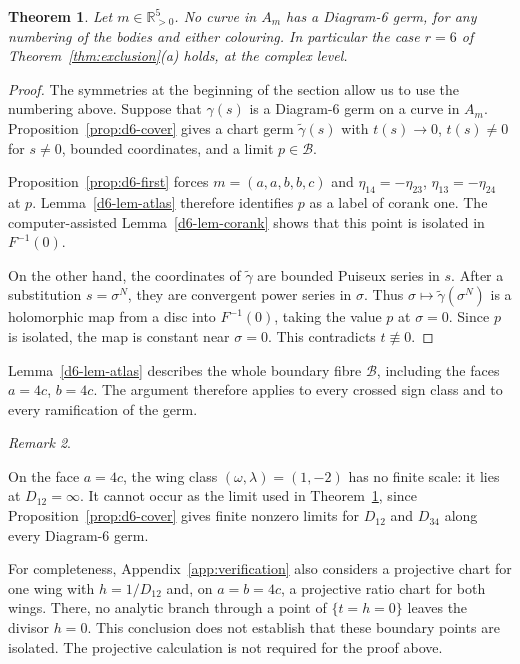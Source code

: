 \documentclass[11pt]{amsart}
\newtheorem{theorem}{Theorem}[section]
\theoremstyle{definition}
\theoremstyle{remark}
\newtheorem{remark}[theorem]{Remark}
\newcommand{\Rp}{\mathbb{R}_{>0}}
\begin{document}
\begin{theorem}\label{thm:d6}
Let $m\in\Rp^5$.  No curve in $A_m$ has a Diagram-6 germ, for any numbering of the bodies and
either colouring.  In particular the case $r=6$ of Theorem~\ref{thm:exclusion}(a) holds, at the
complex level.
\end{theorem}

\begin{proof}
{
The symmetries at the beginning of the section allow us to use the
numbering above.  Suppose that $\gamma(s)$ is a Diagram-6 germ on a curve
in $A_m$.  Proposition~\ref{prop:d6-cover} gives a chart germ
$\tilde\gamma(s)$ with $t(s)\to0$, $t(s)\ne0$ for $s\ne0$, bounded
coordinates, and a limit $p\in\mathcal B$.

Proposition~\ref{prop:d6-first} forces $m=(a,a,b,b,c)$ and
$\eta_{14}=-\eta_{23}$, $\eta_{13}=-\eta_{24}$ at $p$.
Lemma~\ref{d6-lem-atlas} therefore identifies $p$ as a label of corank one.
The computer-assisted Lemma~\ref{d6-lem-corank} shows that this point is
isolated in $F^{-1}(0)$.

On the other hand, the coordinates of $\tilde\gamma$ are bounded Puiseux
series in $s$.  After a substitution $s=\sigma^N$, they are convergent
power series in $\sigma$.  Thus $\sigma\mapsto\tilde\gamma(\sigma^N)$
is a holomorphic map from a disc into $F^{-1}(0)$, taking the value $p$
at $\sigma=0$.  Since $p$ is isolated, the map is constant near
$\sigma=0$.  This contradicts $t\not\equiv0$.
}
\end{proof}

{
Lemma~\ref{d6-lem-atlas} describes the whole boundary fibre $\mathcal B$,
including the faces $a=4c$, $b=4c$.  The argument therefore applies to
every crossed sign class and to every ramification of the germ.
}

\begin{remark}\label{d6-rem-projective}
{
On the face $a=4c$, the wing class $(\omega,\lambda)=(1,-2)$ has no finite
scale: it lies at $D_{12}=\infty$.  It cannot occur as the limit used in
Theorem~\ref{thm:d6}, since Proposition~\ref{prop:d6-cover} gives finite
nonzero limits for $D_{12}$ and $D_{34}$ along every Diagram-6 germ.

For completeness, Appendix~\ref{app:verification} also considers a
projective chart for one wing with $h=1/D_{12}$ and, on $a=b=4c$, a
projective ratio chart for both wings.  There, no analytic branch through
a point of $\{t=h=0\}$ leaves the divisor $h=0$.  This conclusion does not establish that these boundary points are
isolated.  The projective calculation is not required for
the proof above.
}
\end{remark}
\end{document}
